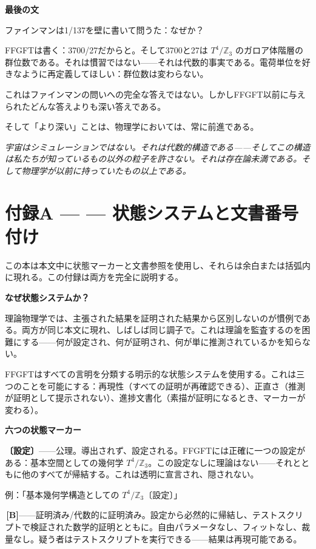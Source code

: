 \documentclass[11pt,openany]{book}
\newcommand{\status}[1]{\penalty10000\,{\tiny\textcolor{gray!70}{[#1]}}}
\begin{document}
\textbf{最後の文}

ファインマンは1/137を壁に書いて問うた：なぜか？

FFGFTは書く：3700/27だからと。そして3700と27は $T^4/\mathbb{Z}_3$ のガロア体階層の群位数である。それは慣習ではない——それは代数的事実である。電荷単位を好きなように再定義してほしい：群位数は変わらない。

これはファインマンの問いへの完全な答えではない。しかしFFGFT以前に与えられたどんな答えよりも深い答えである。

そして「より深い」ことは、物理学においては、常に前進である。

\medskip

\textit{宇宙はシミュレーションではない。それは代数的構造である——そしてこの構造は私たちが知っているもの以外の粒子を許さない。それは存在論未満である。そして物理学が以前に持っていたもの以上である。}

\medskip

\chapter*{付録A — — 状態システムと文書番号付け}

この本は本文中に状態マーカーと文書参照を使用し、それらは余白または括弧内に現れる。この付録は両方を完全に説明する。

\textbf{なぜ状態システムか？}

理論物理学では、主張された結果を証明された結果から区別しないのが慣例である。両方が同じ本文に現れ、しばしば同じ調子で。これは理論を監査するのを困難にする——何が設定され、何が証明され、何が単に推測されているかを知らない。

FFGFTはすべての言明を分類する明示的な状態システムを使用する。これは三つのことを可能にする：再現性（すべての証明が再確認できる）、正直さ（推測が証明として提示されない）、進捗文書化（素描が証明になるとき、マーカーが変わる）。

\textbf{六つの状態マーカー}

\textbf{〔設定〕}——公理。導出されず、設定される。FFGFTには正確に一つの設定がある：基本空間としての幾何学 $T^4/\mathbb{Z}_3$。この設定なしに理論はない——それとともに他のすべてが帰結する。これは透明に宣言され、隠されない。

例：「基本幾何学構造としての $T^4/\mathbb{Z}_3$〔設定〕」

\textbf{\status{B}}——証明済み/代数的に証明済み。設定から必然的に帰結し、テストスクリプトで検証された数学的証明とともに。自由パラメータなし、フィットなし、裁量なし。疑う者はテストスクリプトを実行できる——結果は再現可能である。
\end{document}
